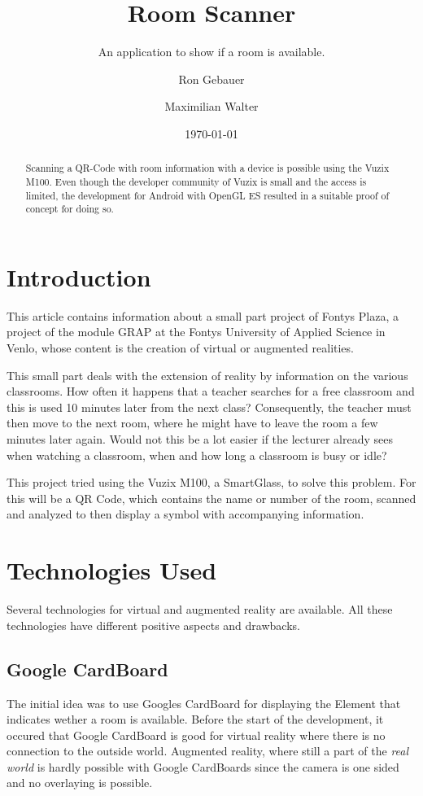 \documentclass[11pt]{scrartcl}
\title{Room Scanner}
\subtitle{An application to show if a room is available.}
\author{Ron Gebauer \and Maximilian Walter}
\date{\today}
\begin{document}
\maketitle

\begin{abstract}
	Scanning a QR-Code with room information with a device is possible using the Vuzix M100. Even though the developer community of Vuzix is small and the access is limited, the development for Android with OpenGL ES resulted in a suitable proof of concept for doing so. 
\end{abstract}

\begin{multicols}{2}
	\section{Introduction}
	This article contains information about a small part project of \glqq Fontys Plaza\grqq, a project of the module GRAP at the Fontys University of Applied Science in Venlo, whose content is the creation of virtual or augmented realities.

	This small part deals with the extension of reality by information on the various classrooms. How often it happens that a teacher searches for a free classroom and this is used 10 minutes later from the next class? Consequently, the teacher must then move to the next room, where he might have to leave the room a few minutes later again. Would not this be a lot easier if the lecturer already sees when watching a classroom, when and how long a classroom is busy or idle?
	
	This project tried using the Vuzix M100, a SmartGlass, to solve this problem. For this will be a QR Code, which contains the name or number of the room, scanned and analyzed to then display a symbol with accompanying information.
	
	\section{Technologies Used}
	Several technologies for virtual and augmented reality are available. All these technologies have different positive aspects and drawbacks.
		\subsection{Google CardBoard}
			The initial idea was to use Googles CardBoard for displaying the Element that indicates wether a room is available. Before the start of the development, it occured that Google CardBoard is good for virtual reality where there is no connection to the outside world. Augmented reality, where still a part of the \emph{real world} is hardly possible with Google CardBoards since the camera is one sided and no overlaying is possible.
	

\end{multicols}
\end{document}
